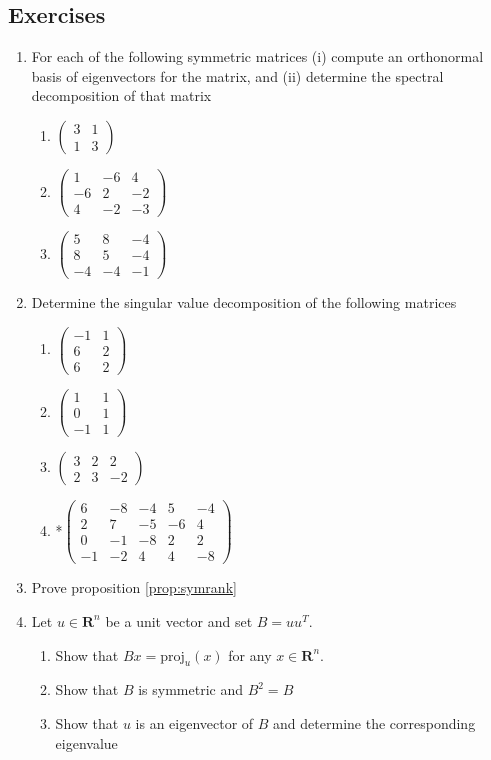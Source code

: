 \documentclass[12pt]{article}
\numberwithin{equation}{subsection}
\numberwithin{figure}{subsection}
\theoremstyle{note}
\newcommand{\R}{\mathbf{R}}
\newcommand\m[1]{\begin{pmatrix}#1\end{pmatrix}}
\newcommand\proj[2]{\mathrm{proj}_{#1}(#2)}
\begin{document}
\subsection{Exercises} 

\begin{enumerate}[label=\arabic*.]
\item For each of the following symmetric matrices (i) compute an orthonormal basis of eigenvectors for the matrix, and (ii) determine the spectral decomposition of that matrix
\begin{enumerate}
	\item $\m{ 3 & 1 \\ 1 & 3}$
	\item $\m{1 & -6 & 4 \\ -6 & 2 & -2 \\ 4 & -2 & -3}$
	\item $\m{5 & 8 & -4 \\ 8 & 5 & -4 \\ -4&-4&-1}$
\end{enumerate}

\item Determine the singular value decomposition of the following matrices

\begin{enumerate}
	\item $\m{-1 & 1 \\ 6 & 2\\ 6 & 2}$
	\item $\m{1 & 1 \\ 0 & 1 \\ -1 & 1}$
	\item $\m{3 & 2 & 2 \\ 2 & 3 & -2}$
	\item *$\m{6 & -8 & -4 & 5 & -4 \\ 2 & 7 & -5 & -6 & 4 \\ 0 & -1 & -8 & 2 & 2 \\ -1 & -2 & 4 & 4 & -8}$
\end{enumerate}

\item Prove proposition \ref{prop:symrank}

\item Let $u\in \R^n$ be a unit vector and set $B=uu^T$. 
\begin{enumerate}
	\item Show that $Bx=\proj{u}{x}$ for any $x\in \R^n$.
	\item Show that $B$ is symmetric and $B^2=B$
	\item Show that $u$ is an eigenvector of $B$ and determine the corresponding eigenvalue


\end{enumerate}
\end{enumerate}
\end{document}
